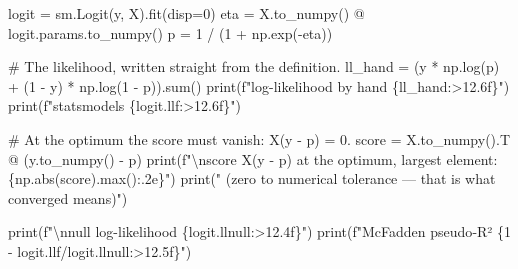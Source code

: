 \documentclass[
  letterpaper,
  10pt,
  twoside,
  openright,
  numbers=noenddot,
  chapterprefix=true]{scrbook}
\newenvironment{Shaded}{}{}
\newcommand{\BuiltInTok}[1]{\textcolor[rgb]{0.84,0.23,0.29}{#1}}
\newcommand{\CharTok}[1]{\textcolor[rgb]{0.01,0.18,0.38}{#1}}
\newcommand{\CommentTok}[1]{\textcolor[rgb]{0.42,0.45,0.49}{#1}}
\newcommand{\DecValTok}[1]{\textcolor[rgb]{0.00,0.36,0.77}{#1}}
\newcommand{\NormalTok}[1]{\textcolor[rgb]{0.14,0.16,0.18}{#1}}
\newcommand{\OperatorTok}[1]{\textcolor[rgb]{0.14,0.16,0.18}{#1}}
\newcommand{\SpecialCharTok}[1]{\textcolor[rgb]{0.00,0.36,0.77}{#1}}
\newcommand{\SpecialStringTok}[1]{\textcolor[rgb]{0.01,0.18,0.38}{#1}}
\newcommand{\StringTok}[1]{\textcolor[rgb]{0.01,0.18,0.38}{#1}}
\begin{document}
\label{check-loglik}
\begin{Shaded}
\begin{Highlighting}[]
\NormalTok{logit }\OperatorTok{=}\NormalTok{ sm.Logit(y, X).fit(disp}\OperatorTok{=}\DecValTok{0}\NormalTok{)}
\NormalTok{eta }\OperatorTok{=}\NormalTok{ X.to\_numpy() }\OperatorTok{@}\NormalTok{ logit.params.to\_numpy()}
\NormalTok{p }\OperatorTok{=} \DecValTok{1} \OperatorTok{/}\NormalTok{ (}\DecValTok{1} \OperatorTok{+}\NormalTok{ np.exp(}\OperatorTok{{-}}\NormalTok{eta))}

\CommentTok{\# The likelihood, written straight from the definition.}
\NormalTok{ll\_hand }\OperatorTok{=}\NormalTok{ (y }\OperatorTok{*}\NormalTok{ np.log(p) }\OperatorTok{+}\NormalTok{ (}\DecValTok{1} \OperatorTok{{-}}\NormalTok{ y) }\OperatorTok{*}\NormalTok{ np.log(}\DecValTok{1} \OperatorTok{{-}}\NormalTok{ p)).}\BuiltInTok{sum}\NormalTok{()}
\BuiltInTok{print}\NormalTok{(}\SpecialStringTok{f"log{-}likelihood by hand  }\SpecialCharTok{\{}\NormalTok{ll\_hand}\SpecialCharTok{:\textgreater{}12.6f\}}\SpecialStringTok{"}\NormalTok{)}
\BuiltInTok{print}\NormalTok{(}\SpecialStringTok{f"statsmodels             }\SpecialCharTok{\{}\NormalTok{logit}\SpecialCharTok{.}\NormalTok{llf}\SpecialCharTok{:\textgreater{}12.6f\}}\SpecialStringTok{"}\NormalTok{)}

\CommentTok{\# At the optimum the score must vanish: X\textquotesingle{}(y {-} p) = 0.}
\NormalTok{score }\OperatorTok{=}\NormalTok{ X.to\_numpy().T }\OperatorTok{@}\NormalTok{ (y.to\_numpy() }\OperatorTok{{-}}\NormalTok{ p)}
\BuiltInTok{print}\NormalTok{(}\SpecialStringTok{f"}\CharTok{\textbackslash{}n}\SpecialStringTok{score X\textquotesingle{}(y {-} p) at the optimum, largest element: }\SpecialCharTok{\{}\NormalTok{np}\SpecialCharTok{.}\BuiltInTok{abs}\NormalTok{(score)}\SpecialCharTok{.}\BuiltInTok{max}\NormalTok{()}\SpecialCharTok{:.2e\}}\SpecialStringTok{"}\NormalTok{)}
\BuiltInTok{print}\NormalTok{(}\StringTok{"  (zero to numerical tolerance — that is what \textquotesingle{}converged\textquotesingle{} means)"}\NormalTok{)}

\BuiltInTok{print}\NormalTok{(}\SpecialStringTok{f"}\CharTok{\textbackslash{}n}\SpecialStringTok{null log{-}likelihood     }\SpecialCharTok{\{}\NormalTok{logit}\SpecialCharTok{.}\NormalTok{llnull}\SpecialCharTok{:\textgreater{}12.4f\}}\SpecialStringTok{"}\NormalTok{)}
\BuiltInTok{print}\NormalTok{(}\SpecialStringTok{f"McFadden pseudo{-}R²      }\SpecialCharTok{\{}\DecValTok{1} \OperatorTok{{-}}\NormalTok{ logit}\SpecialCharTok{.}\NormalTok{llf}\OperatorTok{/}\NormalTok{logit}\SpecialCharTok{.}\NormalTok{llnull}\SpecialCharTok{:\textgreater{}12.5f\}}\SpecialStringTok{"}\NormalTok{)}
\end{Highlighting}
\end{Shaded}
\end{document}
